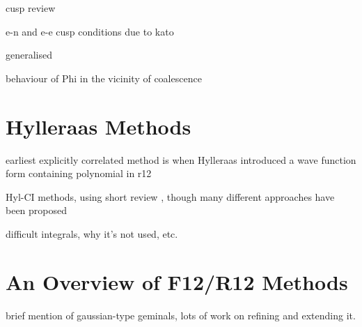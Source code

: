 
cusp review \cite{kurokawaChapterTwoGeneral2016}

e-n and e-e cusp conditions due to kato\cite{katoEigenfunctionsManyparticleSystems1957a}

generalised \cite{packCuspConditionsMolecular1966}

behaviour of Phi in the vicinity of coalescence




\section{Hylleraas Methods}

earliest explicitly correlated method is when Hylleraas introduced a wave function form containing polynomial in r12\cite{hylleraasNeueBerechnungEnergie1929}
\cite{slaterCentralFieldsRydberg1928}


Hyl-CI methods, using short review \cite{largo-cabrerizoHylleraasCI1987}, though many different approaches have been proposed
\cite{jamesGround1933,kolosAccurate1964,perkinsAtomic1968,perkinsAtomic1969,simsCombined1971,simsOneCenter1971,claryHylleraastype1977,claryCIHylleraas1976}

difficult integrals, why it's not used, etc.


\section{An Overview of F12/R12 Methods}

brief mention of gaussian-type geminals\cite{boysIntegral1960,singerUse1960}, lots of work on refining and extending it.\cite{lesterGaussian1964,mitroyTheory2013,bukowskiNew1994,perssonAccurate1996,panGaussian1970,panElectron1972,szalewiczNew1982,szalewiczAtomic1983,wenzelAtomic1986}


